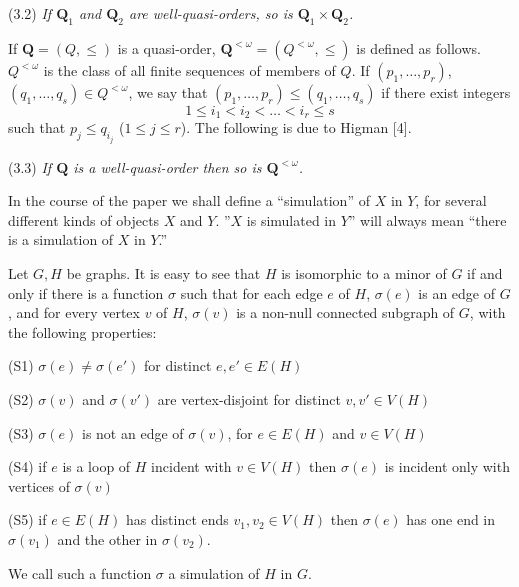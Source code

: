 \stmt
(3.2) \textit{If $\mathbf{Q}_1$ and $\mathbf{Q}_2$ are well-quasi-orders, so is $\mathbf{Q}_1 \times \mathbf{Q}_2$.}

If $\mathbf{Q} = (Q, \le)$ is a quasi-order, $\mathbf{Q}^{<\omega} = (Q^{<\omega}, \le)$ is defined as follows. $Q^{<\omega}$ is the class of all finite sequences of members of $Q$. If $(p_1, \dots, p_r)$, $(q_1, \dots, q_s) \in Q^{<\omega}$, we say that $(p_1, \dots, p_r) \le (q_1, \dots, q_s)$ if there exist integers
\begin{equation*}
1 \le i_1 < i_2 < \dots < i_r \le s
\end{equation*}
such that $p_j \le q_{i_j}$ ($1 \le j \le r$). The following is due to Higman [4].

\stmt
(3.3) \textit{If $\mathbf{Q}$ is a well-quasi-order then so is $\mathbf{Q}^{<\omega}$.}


In the course of the paper we shall define a ``simulation'' of $X$ in $Y$, for several different kinds of objects $X$ and $Y$. ''$X$ is simulated in $Y$'' will always mean ``there is a simulation of $X$ in $Y$.''

Let $G, H$ be graphs. It is easy to see that $H$ is isomorphic to a minor of $G$ if and only if there is a function $\sigma$ such that for each edge $e$ of $H$, $\sigma(e)$ is an edge of $G$, and for every vertex $v$ of $H$, $\sigma(v)$ is a non-null connected subgraph of $G$, with the following properties:

\hspace*{12pt}(S1) $\sigma(e) \ne \sigma(e')$ for distinct $e, e' \in E(H)$

\hspace*{12pt}(S2) $\sigma(v)$ and $\sigma(v')$ are vertex-disjoint for distinct $v, v' \in V(H)$

\hspace*{12pt}(S3) $\sigma(e)$ is not an edge of $\sigma(v)$, for $e \in E(H)$ and $v \in V(H)$

\hspace*{12pt}(S4) if $e$ is a loop of $H$ incident with $v \in V(H)$ then $\sigma(e)$ is incident only with vertices of $\sigma(v)$

\hspace*{12pt}(S5) if $e \in E(H)$ has distinct ends $v_1, v_2 \in V(H)$ then $\sigma(e)$ has one end in $\sigma(v_1)$ and the other in $\sigma(v_2)$.

We call such a function $\sigma$ a simulation of $H$ in $G$.

